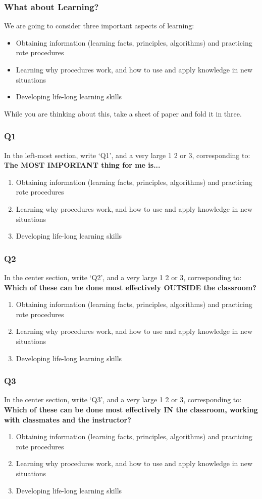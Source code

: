 \documentclass[aspectration=1610]{beamer}
\begin{document}
\begin{frame}\frametitle{What about Learning?}
We are going to consider three important aspects of learning:
\begin{itemize}
\item Obtaining information (learning facts, principles, algorithms) and practicing rote procedures
\item Learning why procedures work, and how to use and apply knowledge in new situations
\item Developing life-long learning skills
\end{itemize}

While you are thinking about this, take a sheet of paper and fold it in three.
\end{frame}

\begin{frame}\frametitle{Q1}
In the left-most section, write `Q1', and a very large 1 2 or 3, corresponding to:
\vfill
\textbf{The MOST IMPORTANT thing for me is...}
\vfill
\begin{enumerate}
\item Obtaining information (learning facts, principles, algorithms) and practicing rote procedures
\item Learning why procedures work, and how to use and apply knowledge in new situations
\item Developing life-long learning skills
\end{enumerate}
\end{frame}

\begin{frame}\frametitle{Q2}
In the center section, write `Q2', and a very large 1 2 or 3, corresponding to:
\vfill
\textbf{Which of these can be done most effectively OUTSIDE the classroom?}
\vfill
\begin{enumerate}
\item Obtaining information (learning facts, principles, algorithms) and practicing rote procedures
\item Learning why procedures work, and how to use and apply knowledge in new situations
\item Developing life-long learning skills
\end{enumerate}
\end{frame}

\begin{frame}\frametitle{Q3}
In the center section, write `Q3', and a very large 1 2 or 3, corresponding to:
\vfill
\textbf{Which of these can be done most effectively IN the classroom, working with classmates and the instructor?}
\vfill
\begin{enumerate}
\item Obtaining information (learning facts, principles, algorithms) and practicing rote procedures
\item Learning why procedures work, and how to use and apply knowledge in new situations
\item Developing life-long learning skills
\end{enumerate}
\end{frame}
\end{document}
